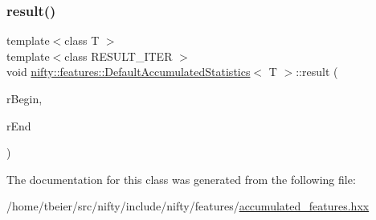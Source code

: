 \subsubsection{\texorpdfstring{result()}{result()}}
{\footnotesize\ttfamily template$<$class T $>$ \\
template$<$class R\+E\+S\+U\+L\+T\+\_\+\+I\+T\+ER $>$ \\
void \hyperlink{classnifty_1_1features_1_1DefaultAccumulatedStatistics}{nifty\+::features\+::\+Default\+Accumulated\+Statistics}$<$ T $>$\+::result (\begin{DoxyParamCaption}\item[{R\+E\+S\+U\+L\+T\+\_\+\+I\+T\+ER}]{r\+Begin,  }\item[{R\+E\+S\+U\+L\+T\+\_\+\+I\+T\+ER}]{r\+End }\end{DoxyParamCaption})\hspace{0.3cm}{\ttfamily [inline]}}



The documentation for this class was generated from the following file\+:\begin{DoxyCompactItemize}
\item 
/home/tbeier/src/nifty/include/nifty/features/\hyperlink{accumulated__features_8hxx}{accumulated\+\_\+features.\+hxx}\end{DoxyCompactItemize}
